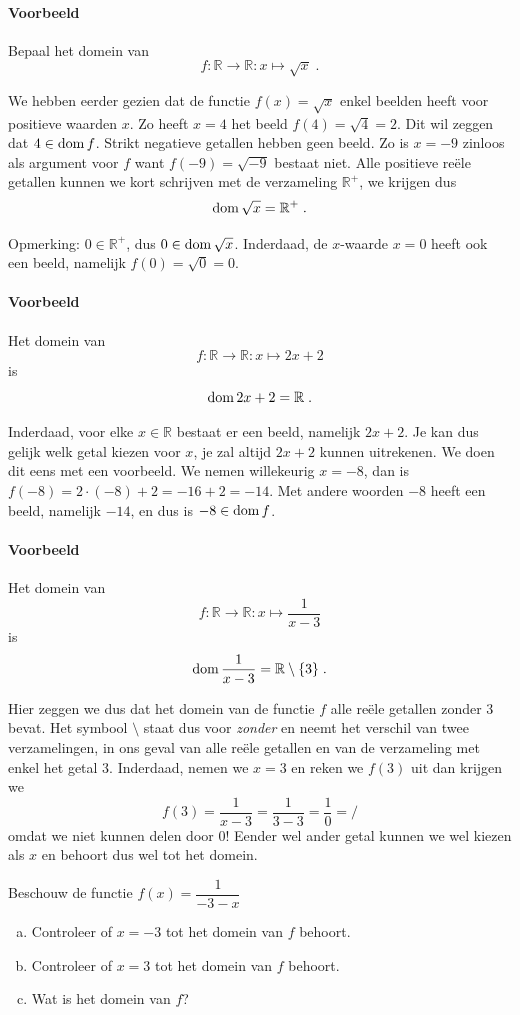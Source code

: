 \documentclass[12pt,a4paper,twoside]{article}
\begin{document}
\paragraph{Voorbeeld} Bepaal het domein van $$f:\mathbb{R}\to\mathbb{R}:x\mapsto \sqrt{x}\;.$$

We hebben eerder gezien dat de functie $f(x)=\sqrt{x}$ enkel beelden heeft voor positieve waarden $x$. Zo heeft $x=4$ het beeld $f(4)=\sqrt{4}=2$. Dit wil zeggen dat $4\in\dom f$. Strikt negatieve getallen hebben geen beeld. Zo is $x=-9$ zinloos als argument voor $f$ want $f(-9)=\sqrt{-9}$ bestaat niet. Alle positieve reële getallen kunnen we kort schrijven met de verzameling $\mathbb{R}^+$, we krijgen dus
$$\dom \sqrt{x}= \mathbb{R}^+\;.$$

Opmerking: $0\in\mathbb{R}^+$, dus $0\in\dom\sqrt{x}$. Inderdaad, de $x$-waarde $x=0$ heeft ook een beeld, namelijk $f(0)=\sqrt{0}=0$.

\paragraph{Voorbeeld}
Het domein van
$$f:\mathbb{R}\to\mathbb{R}:x\mapsto 2x+2$$
is
$$\dom 2x+2 = \mathbb{R}\;.$$

Inderdaad, voor elke $x\in\mathbb{R}$ bestaat er een beeld, namelijk $2x+2$. Je kan dus gelijk welk getal kiezen voor $x$, je zal altijd $2x+2$ kunnen uitrekenen. We doen dit eens met een voorbeeld. We nemen willekeurig $x=-8$, dan is $f(-8)=2\cdot(-8)+2=-16+2=-14$. Met andere woorden $-8$ heeft een beeld, namelijk $-14$, en dus is $-8\in\dom f$.

\paragraph{Voorbeeld}
Het domein van
$$f:\mathbb{R}\to\mathbb{R}:x\mapsto \dfrac{1}{x-3}$$
is
$$\dom \dfrac{1}{x-3} = \mathbb{R}\setminus\{3\}\;.$$

Hier zeggen we dus dat het domein van de functie $f$ alle reële getallen zonder $3$ bevat. Het symbool $\setminus$ staat dus voor {\em zonder} en neemt het verschil van twee verzamelingen, in ons geval van alle reële getallen en van de verzameling met enkel het getal $3$. Inderdaad, nemen we $x=3$ en reken we $f(3)$ uit dan krijgen we
$$f(3)=\dfrac{1}{x-3}=\dfrac{1}{3-3}=\dfrac{1}{0}=/$$
omdat we niet kunnen delen door $0$! Eender wel ander getal kunnen we wel kiezen als $x$ en behoort dus wel tot het domein.

\begin{oefening}
  Beschouw de functie $\displaystyle f(x)=\dfrac{1}{-3-x}$\\
  \begin{enumerate}[(a)]
  \itemsep.5em
  \item Controleer of $x=-3$ tot het domein van $f$ behoort.
  \item Controleer of $x=3$ tot het domein van $f$ behoort.
  \item Wat is het domein van $f$?
  \end{enumerate}
\end{oefening}
\end{document}
